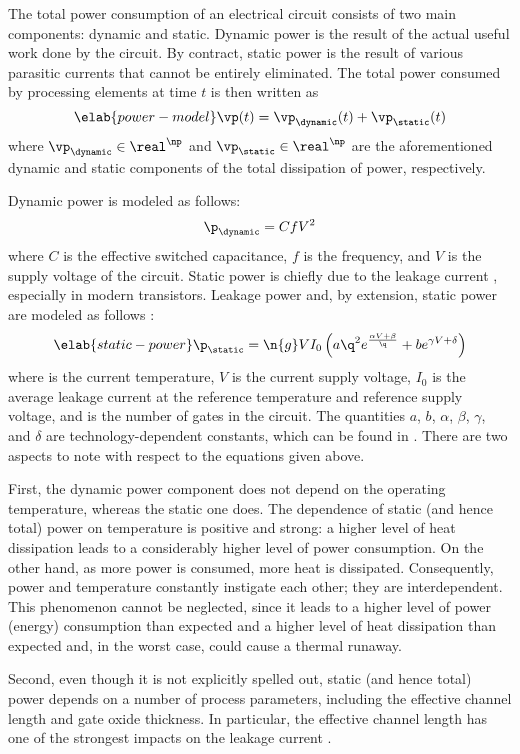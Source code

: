 The total power consumption of an electrical circuit consists of two main
components: dynamic and static. Dynamic power is the result of the actual useful
work done by the circuit. By contract, static power is the result of various
parasitic currents that cannot be entirely eliminated. The total power consumed
by \np processing elements at time $t$ is then written as
\begin{equation} \elab{power-model}
  \vp(t) = \vp_\dynamic(t) + \vp_\static(t)
\end{equation}
where $\vp_\dynamic \in \real^\np$ and $\vp_\static \in \real^\np$ are the
aforementioned dynamic and static components of the total dissipation of power,
respectively.

Dynamic power is modeled as follows:
\[
  \p_\dynamic = C f V^2
\]
where $C$ is the effective switched capacitance, $f$ is the frequency, and $V$
is the supply voltage of the circuit. Static power is chiefly due to the leakage
current \cite{chandrakasan2000, srivastava2010, juan2011, juan2012}, especially
in modern  transistors. Leakage power and, by extension, static power
are modeled as follows \cite{liao2005}:
\begin{equation} \elab{static-power}
  \p_\static = \n{g} V I_0 \left(a \q^2 e^{\frac{\alpha V + \beta}{\q}} + b e^{\gamma V + \delta}\right)
\end{equation}
where \q is the current temperature, $V$ is the current supply voltage, $I_0$ is
the average leakage current at the reference temperature and reference supply
voltage, and  is the number of gates in the circuit. The quantities $a$,
$b$, $\alpha$, $\beta$, $\gamma$, and $\delta$ are technology-dependent
constants, which can be found in \cite{liao2005}. There are two aspects to note
with respect to the equations given above.

First, the dynamic power component does not depend on the operating temperature,
whereas the static one does. The dependence of static (and hence total) power on
temperature is positive and strong: a higher level of heat dissipation leads to
a considerably higher level of power consumption. On the other hand, as more
power is consumed, more heat is dissipated. Consequently, power and temperature
constantly instigate each other; they are interdependent. This phenomenon cannot
be neglected, since it leads to a higher level of power (energy) consumption
than expected and a higher level of heat dissipation than expected and, in the
worst case, could cause a thermal runaway.

Second, even though it is not explicitly spelled out, static (and hence total)
power depends on a number of process parameters, including the effective channel
length and gate oxide thickness. In particular, the effective channel length has
one of the strongest impacts on the leakage current \cite{juan2012}.
